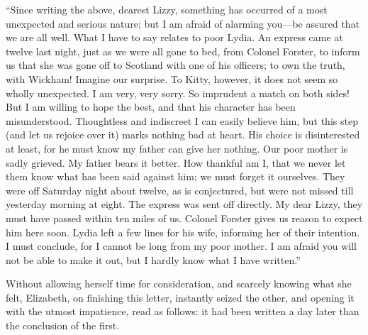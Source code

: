 ``Since writing the above, dearest Lizzy, something has occurred of a most unexpected and serious nature; but I am afraid of alarming you---be assured that we are all well. What I have to say relates to poor Lydia. An express came at twelve last night, just as we were all gone to bed, from Colonel Forster, to inform us that she was gone off to Scotland with one of his officers; to own the truth, with Wickham! Imagine our surprise. To Kitty, however, it does not seem so wholly unexpected. I am very, very sorry. So imprudent a match on both sides! But I am willing to hope the best, and that his character has been misunderstood. Thoughtless and indiscreet I can easily believe him, but this step (and let us rejoice over it) marks nothing bad at heart. His choice is disinterested at least, for he must know my father can give her nothing. Our poor mother is sadly grieved. My father bears it better. How thankful am I, that we never let them know what has been said against him; we must forget it ourselves. They were off Saturday night about twelve, as is conjectured, but were not missed till yesterday morning at eight. The express was sent off directly. My dear Lizzy, they must have passed within ten miles of us. Colonel Forster gives us reason to expect him here soon. Lydia left a few lines for his wife, informing her of their intention. I must conclude, for I cannot be long from my poor mother. I am afraid you will not be able to make it out, but I hardly know what I have written.''

Without allowing herself time for consideration, and scarcely knowing what she felt, Elizabeth, on finishing this letter, instantly seized the other, and opening it with the utmost impatience, read as follows: it had been written a day later than the conclusion of the first.

